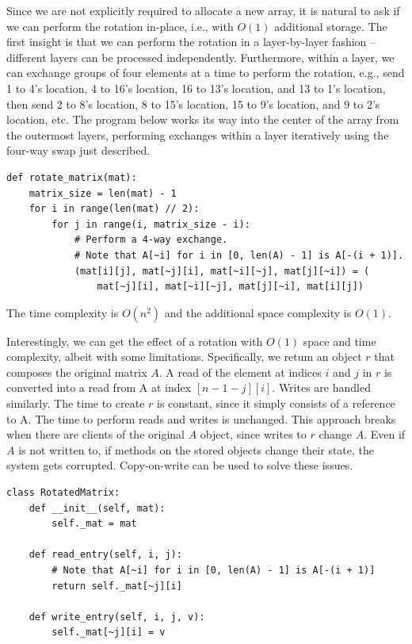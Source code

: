 \documentclass[11pt,a4paper]{article}
\begin{document}
Since we are not explicitly required to allocate a new array, it is natural to
ask if we can perform the rotation in-place, i.e., with $O(1)$ additional
storage. The first insight is that we can perform the rotation in a
layer-by-layer fashion -- different layers can be processed independently.
Furthermore, within a layer, we can exchange groups of four elements at a time
to perform the rotation, e.g., send 1 to 4's location, 4 to 16's location, 16
to 13's location, and 13 to 1's location, then send 2 to 8's location, 8 to
15's location, 15 to 9's location, and 9 to 2's location, etc. The program
below works its way into the center of the array from the outermost layers,
performing exchanges within a layer iteratively using the four-way swap just
described.

\begin{verbatim}
def rotate_matrix(mat): 
    matrix_size = len(mat) - 1
    for i in range(len(mat) // 2):
        for j in range(i, matrix_size - i):
            # Perform a 4-way exchange. 
            # Note that A[~i] for i in [0, len(A) - 1] is A[-(i + 1)].
            (mat[i][j], mat[~j][i], mat[~i][~j], mat[j][~i]) = (
                mat[~j][i], mat[~i][~j], mat[j][~i], mat[i][j])
\end{verbatim}  

The time complexity is $O(n^2)$ and the additional space complexity is $O(1)$.

Interestingly, we can get the effect of a rotation with $O(1)$ space and time
complexity, albeit with some limitations. Specifically, we retum an object $r$
that composes the original matrix $A$. A read of the element at indices $i$
and $j$ in $r$ is converted into a read from A at index $[n-1-j][i]$. Writes
are handled similarly. The time to create $r$ is constant, since it simply
consists of a reference to A. The time to perform reads and writes is
unchanged. This approach breaks when there are clients of the original $A$
object, since writes to $r$ change $A$. Even if $A$ is not written to, if
methods on the stored objects change their state, the system gets corrupted.
Copy-on-write can be used to solve these issues.

\begin{verbatim}
class RotatedMatrix:
    def __init__(self, mat):
        self._mat = mat

    def read_entry(self, i, j):
        # Note that A[~i] for i in [0, len(A) - 1] is A[-(i + 1)] 
        return self._mat[~j][i]

    def write_entry(self, i, j, v): 
        self._mat[~j][i] = v
\end{verbatim} 
\end{document}
